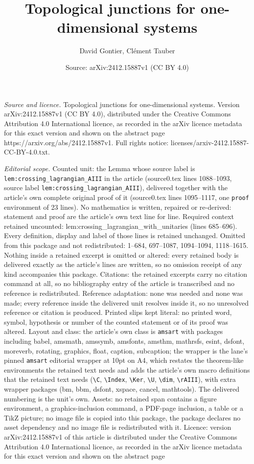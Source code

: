 \documentclass[10pt,a4paper]{amsart}
\title[Topological junctions for one-dimensional systems]{Topological junctions for one-dimensional systems}
\author{David Gontier, Cl\'ement Tauber}
\date{Source: arXiv:2412.15887v1 (CC BY 4.0)}
\begin{document}
\maketitle

\noindent\emph{Source and licence.} Topological junctions for one-dimensional systems. Version arXiv:2412.15887v1 (CC BY 4.0), distributed under the Creative Commons Attribution 4.0 International licence, as recorded in the arXiv licence metadata for this exact version and shown on the abstract page https://arxiv.org/abs/2412.15887v1. Full rights notice: licenses/arxiv-2412.15887-CC-BY-4.0.txt.\par\smallskip

\noindent\textit{Editorial scope.} Counted unit: the Lemma whose source label is \texttt{lem:crossing\_lagrangian\_AIII} in the article (source0.tex lines 1088--1093, source label \texttt{lem:crossing\_lagrangian\_AIII}), delivered together with the article's own complete original proof of it (source0.tex lines 1095--1117, one \texttt{proof} environment of 23 lines). No mathematics is written, repaired or re-derived: statement and proof are the article's own text line for line. Required context retained uncounted: lem:crossing\_lagrangian\_with\_unitaries (lines 685--696). Every definition, display and label of those lines is retained unchanged. Omitted from this package and not redistributed: 1--684, 697--1087, 1094--1094, 1118--1615. Nothing inside a retained excerpt is omitted or altered: every retained body is delivered exactly as the article's lines are written, so no omission receipt of any kind accompanies this package. Citations: the retained excerpts carry no citation command at all, so no bibliography entry of the article is transcribed and no reference is redistributed. Reference adaptation: none was needed and none was made; every reference inside the delivered unit resolves inside it, so no unresolved reference or citation is produced. Printed slips kept literal: no printed word, symbol, hypothesis or number of the counted statement or of its proof was altered. Layout and class: the article's own class is \texttt{amsart} with packages including babel, amsmath, amssymb, amsfonts, amsthm, mathrsfs, esint, dsfont, moreverb, rotating, graphics, float, caption, subcaption; the wrapper is the lane's pinned \texttt{amsart} editorial wrapper at 10pt on A4, which restates the theorem-like environments the retained text needs and adds the article's own macro definitions that the retained text needs (\texttt{\textbackslash C}, \texttt{\textbackslash Index}, \texttt{\textbackslash Ker}, \texttt{\textbackslash U}, \texttt{\textbackslash dim}, \texttt{\textbackslash rAIII}), with extra wrapper packages (bm, bbm, dsfont, xspace, cancel, mathtools). The delivered numbering is the unit's own. Assets: no retained span contains a figure environment, a graphics-inclusion command, a PDF-page inclusion, a table or a TikZ picture; no image file is copied into this package, the package declares no asset dependency and no image file is redistributed with it. Licence: version arXiv:2412.15887v1 of this article is distributed under the Creative Commons Attribution 4.0 International licence, as recorded in the arXiv licence metadata for this exact version and shown on the abstract page 
\end{document}
